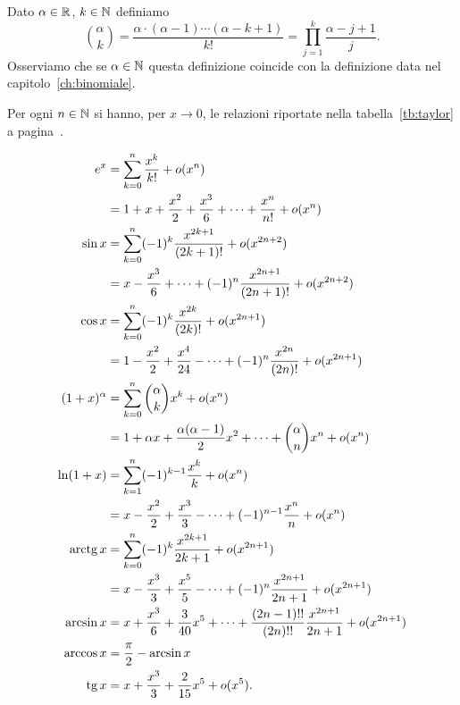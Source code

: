 \begin{definition}
\label{def:binomiale_reale}%
\mymark{***}%
Dato $\alpha \in {\mathbb R}$, $k \in {\mathbb N}$ definiamo
\[
 {\alpha \choose k } 
 = \frac{\alpha \cdot (\alpha-1) \cdots (\alpha -k +1)}{k!}
 = \prod_{j=1}^k \frac{\alpha-j+1}{j}.
\]
Osserviamo che se $\alpha \in {\mathbb N}$ questa definizione coincide
con la definizione data nel capitolo~\ref{ch:binomiale}.
\end{definition}

\begin{theorem}
\label{th:sviluppi_taylor}%
\mymark{***}%
Per ogni $n\in {\mathbb N}$ si hanno, per $x\to 0$,
le relazioni riportate nella tabella~\ref{tb:taylor}
a pagina~\pageref{tb:taylor}.
\end{theorem}
\begin{table}
\begin{align*}
e^x &= \sum_{k=0}^n \frac{x^k}{k!} + o(x^n) \\
  &= 1 + x + \frac{x^2}{2} + \frac {x^3}{6} + \dots + \frac{x^n}{n!} + o(x^n) \\
\sin x &= \sum_{k=0}^n (-1)^k\frac{x^{2k+1}}{(2k+1)!} + o(x^{2n+2}) \\
 &= x - \frac{x^3}{6} + \dots + (-1)^{n} \frac{x^{2n+1}}{(2n+1)!}  + o(x^{2n+2})\\
 \cos x &= \sum_{k=0}^n (-1)^k \frac{x^{2k}}{(2k)!} + o(x^{2n+1}) \\
   &= 1 - \frac{x^2}{2} + \frac{x^4}{24} - \dots + (-1)^n\frac{x^{2n}}{(2n)!} + o(x^{2n+1})\\
 (1+x)^\alpha &= \sum_{k=0}^n {\alpha \choose k} x^k + o(x^n)\\
    &= 1 + \alpha x + \frac{\alpha (\alpha-1)}{2} x^2 + \dots + {\alpha \choose n} x^n + o(x^n) \\
  \ln (1+x) &= \sum_{k=1}^n (-1)^{k-1} \frac{x^k}{k} + o(x^n) \\
         &= x - \frac{x^2}{2} + \frac{x^3}{3} - \dots + (-1)^{n-1}\frac{x^n}{n} + o(x^n) \\
  \operatorname{arctg} x &= \sum_{k=0}^n (-1)^k \frac{x^{2k+1}}{2k+1} + o(x^{2n+1})\\
    &= x - \frac{x^3}{3} + \frac{x^5}{5} - \dots + (-1)^n \frac{x^{2n+1}}{2n +1} + o(x^{2n+1})\\
  \arcsin x &= x + \frac{x^3}{6} + \frac{3}{40} x^5 + \dots + \frac{(2n-1)!!}{(2n)!!} \frac{x^{2n+1}}{2n+1} + o(x^{2n+1}) \\
  \arccos x &= \frac \pi 2 - \arcsin x\\
  \operatorname{tg} x &= x + \frac{x^3}{3} + \frac{2}{15} x^5 + o(x^5).
\end{align*}
\caption{sviluppi di Taylor, per $x\to 0$, di alcune funzioni elementari.
%
%
Si veda il teorema~\ref{th:sviluppi_taylor}.}
\label{tb:taylor}%
\end{table}
